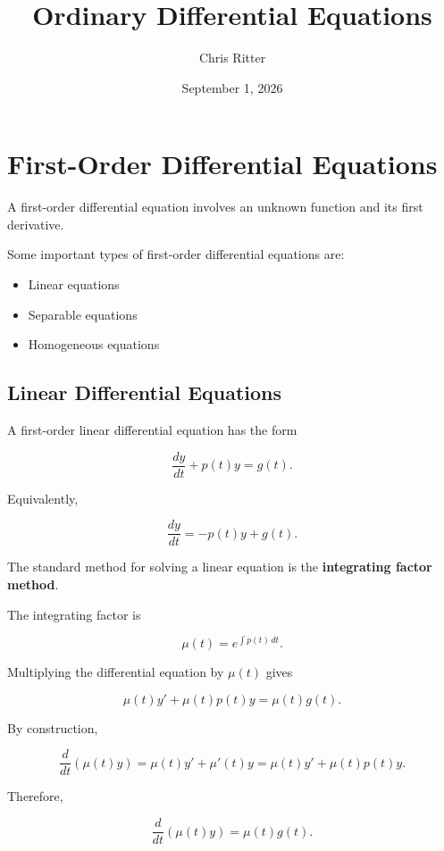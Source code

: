 \documentclass[11pt]{article}
\title{Ordinary Differential Equations}
\author{Chris Ritter}
\date{September 1, 2026}
\begin{document}
\maketitle
\tableofcontents
\newpage

\section{First-Order Differential Equations}

A first-order differential equation involves an unknown function and
its first derivative.

Some important types of first-order differential equations are:

\begin{itemize}
    \item Linear equations
    \item Separable equations
    \item Homogeneous equations
\end{itemize}

\subsection{Linear Differential Equations}

A first-order linear differential equation has the form

\[
\frac{dy}{dt} + p(t)y = g(t).
\]

Equivalently,

\[
\frac{dy}{dt} = -p(t)y + g(t).
\]

The standard method for solving a linear equation is the
\textbf{integrating factor method}.

The integrating factor is

\[
\mu(t)
=
e^{\int p(t)\,dt}.
\]

Multiplying the differential equation by \(\mu(t)\) gives

\[
\mu(t)y' + \mu(t)p(t)y
=
\mu(t)g(t).
\]

By construction,

\[
\frac{d}{dt}\left(\mu(t)y\right)
=
\mu(t)y' + \mu'(t)y
=
\mu(t)y' + \mu(t)p(t)y.
\]

Therefore,

\[
\frac{d}{dt}\left(\mu(t)y\right)
=
\mu(t)g(t).
\]
\end{document}
